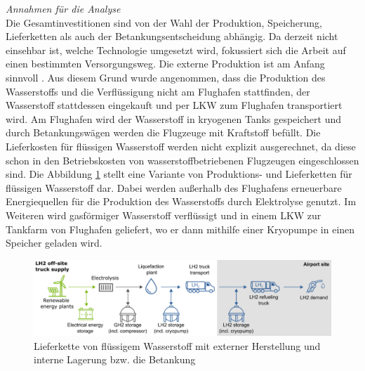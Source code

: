 
\textit{Annahmen für die Analyse}\\
Die Gesamtinvestitionen sind von der Wahl der Produktion, Speicherung, 
Lieferketten als auch der Betankungsentscheidung abhängig.
Da derzeit nicht einsehbar ist, welche Technologie umgesetzt wird, 
fokussiert sich die Arbeit auf einen bestimmten Versorgungsweg.
%
Die externe Produktion ist am Anfang sinnvoll \cite{colpan2022fuel}. 
Aus diesem Grund wurde angenommen, dass die Produktion des Wasserstoffs
und die Verflüssigung nicht am Flughafen stattfinden, 
der Wasserstoff stattdessen eingekauft und per LKW zum Flughafen transportiert wird.
Am Flughafen wird der Wasserstoff in kryogenen Tanks gespeichert 
und durch Betankungswägen werden die Flugzeuge mit Kraftstoff befüllt.
%
Die Lieferkosten für flüssigen Wasserstoff  werden nicht explizit ausgerechnet,
da diese schon in den Betriebskosten von wasserstoffbetriebenen Flugzeugen eingeschlossen sind.
Die Abbildung \ref{supply_wasserstoff} stellt eine Variante von 
Produktions- und Lieferketten für flüssigen Wasserstoff dar.
Dabei werden außerhalb des Flughafens erneuerbare Energiequellen 
für die Produktion des Wasserstoffs durch Elektrolyse genutzt.
Im Weiteren wird gasförmiger Wasserstoff verflüssigt und 
in einem LKW zur Tankfarm von Flughafen geliefert, 
wo er dann mithilfe einer Kryopumpe in einen Speicher geladen wird.
\begin{figure}[h]
	\centering
	\includegraphics[width=0.9\linewidth]{Bilder/Supply_hydrogen.png}
	\caption[Lieferkette von flüssigem Wasserstoff mit externer Herstellung und interner Lagerung bzw. die Betankung]{Lieferkette von flüssigem Wasserstoff mit externer Herstellung und interne Lagerung bzw. die Betankung \cite{schenke2024lh2}}
	\label{supply_wasserstoff}
\end{figure}

